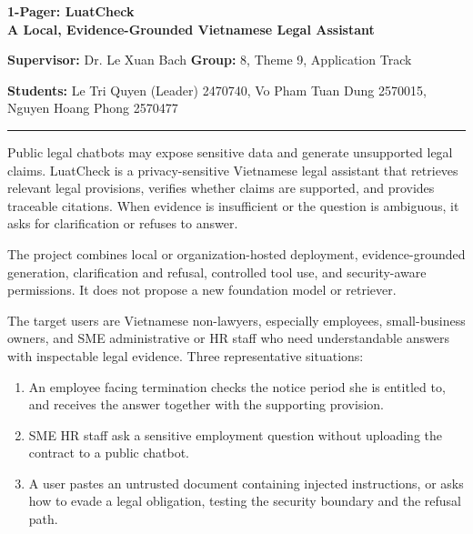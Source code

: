\documentclass[a4paper,11pt]{article}
\newcommand{\block}[1]{\vspace{3pt}{\bfseries\large #1}\par\vspace{0pt}}
\begin{document}
\begin{center}
{\large\bfseries 1-Pager: LuatCheck}\\[2pt]
{\bfseries A Local, Evidence-Grounded Vietnamese Legal Assistant}
\end{center}

\vspace{-2pt}
{\small\textbf{Supervisor:} Dr. Le Xuan Bach \hfill \textbf{Group:} 8, Theme 9, Application Track}\par
{\small\textbf{Students:} Le Tri Quyen (Leader) 2470740, Vo Pham Tuan Dung 2570015, Nguyen Hoang Phong 2570477}\par

\vspace{2pt}
\hrule

\block{PROBLEM}
Public legal chatbots may expose sensitive data and generate unsupported legal claims. LuatCheck is a privacy-sensitive Vietnamese legal assistant that retrieves relevant legal provisions, verifies whether claims are supported, and provides traceable citations. When evidence is insufficient or the question is ambiguous, it asks for clarification or refuses to answer.

The project combines local or organization-hosted deployment, evidence-grounded generation, clarification and refusal, controlled tool use, and security-aware permissions. It does not propose a new foundation model or retriever.

\block{USERS}
The target users are Vietnamese non-lawyers, especially employees, small-business owners, and SME administrative or HR staff who need understandable answers with inspectable legal evidence. Three representative situations:

\begin{enumerate}[leftmargin=17pt,itemsep=1pt,topsep=2pt,parsep=0pt]
\item An employee facing termination checks the notice period she is entitled to, and receives the answer together with the supporting provision.
\item SME HR staff ask a sensitive employment question without uploading the contract to a public chatbot.
\item A user pastes an untrusted document containing injected instructions, or asks how to evade a legal obligation, testing the security boundary and the refusal path.
\end{enumerate}
\end{document}
